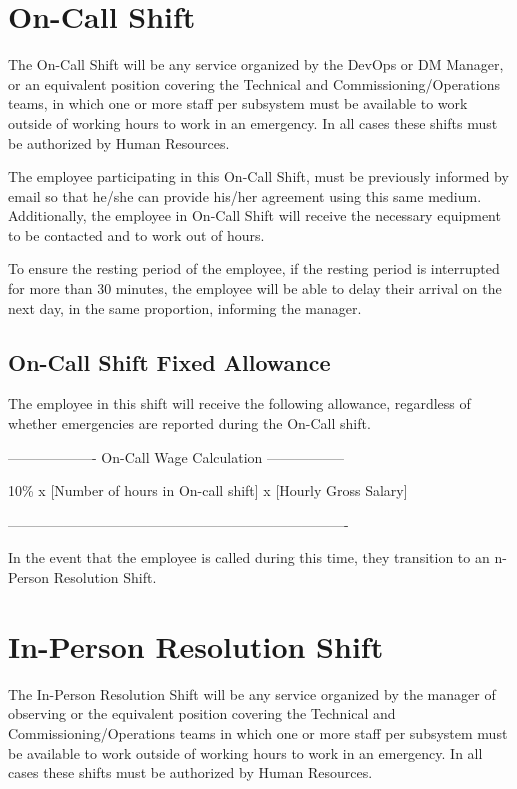 \section{On-Call Shift}

The On-Call Shift will be any service organized by the DevOps or DM Manager, or an equivalent position covering the Technical and Commissioning/Operations teams, in which one or more staff per subsystem must be available to work outside of working hours to work in an emergency.
In all cases these shifts must be authorized by Human Resources.

The employee participating in this On-Call Shift, must be previously informed by email so that he/she can provide his/her agreement using this same medium. Additionally, the employee in On-Call Shift will receive the necessary equipment to be contacted and to work out of hours.

To ensure the resting period of the employee, if the resting period is interrupted for more than 30 minutes, the employee will be able to delay their arrival on the next day, in the same proportion, informing the manager.

\subsection{On-Call Shift Fixed Allowance}

The employee in this shift will receive the following allowance, regardless of whether emergencies are reported during the On-Call shift.

\begin{center} -------------------  On-Call Wage Calculation ----------------- \end{center}
10\% x [Number of hours in On-call shift] x [Hourly Gross Salary]
\begin{center} ------------------------------------------------------------------------- \end{center}

In the event that the employee is called during this time, they transition to an n-Person Resolution Shift.

\section{In-Person Resolution Shift}

The In-Person Resolution Shift will be any service organized by the manager of observing or the equivalent position covering the Technical and Commissioning/Operations teams in which one or more staff per subsystem must be available to work outside of working hours to work in an emergency.
In all cases these shifts must be authorized by Human Resources.

